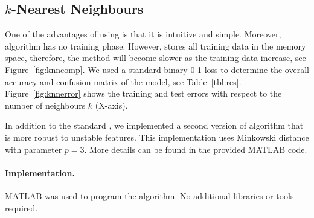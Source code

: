 \subsection{$k$-Nearest Neighbours}
\label{sec:knn}

One of the advantages of using \knn{} is that it is 
intuitive and simple. Moreover, \knn{} algorithm has no training 
phase. 
However, \knn{} stores all training data in the memory space, 
therefore, the method will become slower as the training data 
increase, see Figure~\ref{fig:knncomp}.
We used 
a standard binary 0-1 loss to determine the overall 
accuracy and confusion matrix of the model, see Table~\ref{tbl:res}.
Figure~\ref{fig:knnerror} shows the training and test errors with 
respect to the number 
of neighbours $k$ (X-axis). 

In addition to the standard \knn{}, we implemented a second version 
of 
\knn{} algorithm that is more 
robust to unstable features. This implementation uses Minkowski 
distance with parameter $p=3$. More details can be found in the 
provided MATLAB code. 


\paragraph{Implementation.}
MATLAB was used to program the \knn{} algorithm. No additional 
libraries or tools required. 


